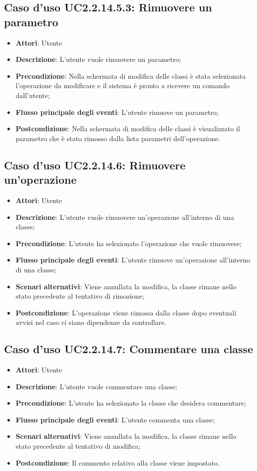\documentclass[../AnalisiDeiRequisiti.tex]{subfiles}
\begin{document}
			\subsection{Caso d'uso UC2.2.14.5.3: Rimuovere un parametro}
			\begin{itemize}
				\item \textbf{Attori}: Utente
				\item \textbf{Descrizione}: L'utente vuole rimuovere un parametro;
				\item \textbf{Precondizione}: Nella schermata di modifica delle classi è stata selezionata l'operazione da modificare e il sistema è pronto a ricevere un comando dall'utente;
				\item \textbf{Flusso principale degli eventi}: L'utente rimuove un parametro;
				\item \textbf{Postcondizione}: Nella schermata di modifica delle classi è visualizzato il parametro che è stato rimosso dalla lista parametri dell'operazione.
			\end{itemize}
			\subsection{Caso d'uso UC2.2.14.6: Rimuovere un'operazione}
			\begin{itemize}
				\item \textbf{Attori}: Utente
				\item \textbf{Descrizione}: L'utente vuole rimuovere un'operazione all'interno di una classe;
				\item \textbf{Precondizione}: L'utente ha selezionato l'operazione che vuole rimuovere;
				\item \textbf{Flusso principale degli eventi}: L'utente rimuove un'operazione all'interno di una classe;
				\item \textbf{Scenari alternativi}: Viene annullata la modifica, la classe rimane nello stato precedente al tentativo di rimozione;
				\item \textbf{Postcondizione}: L'operazione viene rimossa dalla classe dopo eventuali avvisi nel caso ci siano dipendenze da controllare.
			\end{itemize}
			\subsection{Caso d'uso UC2.2.14.7: Commentare una classe}
			\begin{itemize}
				\item \textbf{Attori}: Utente
				\item \textbf{Descrizione}: L'utente vuole commentare una classe;
				\item \textbf{Precondizione}: L'utente ha selezionato la classe che desidera commentare;
				\item \textbf{Flusso principale degli eventi}: L'utente commenta una classe;
				\item \textbf{Scenari alternativi}: Viene annullata la modifica, la classe rimane nello stato precedente al tentativo di modifica;
				\item \textbf{Postcondizione}: Il commento relativo alla classe viene impostato.
			\end{itemize}
\end{document}
